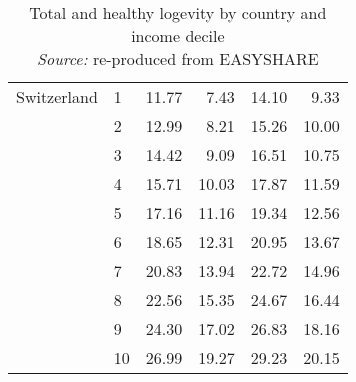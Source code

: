 \begin{table}
\begin{tabular}{llrrrr}
Switzerland & 1  &   11.77 &   7.43 &  14.10 &   9.33 \\
            & 2  &   12.99 &   8.21 &  15.26 &  10.00 \\
            & 3  &   14.42 &   9.09 &  16.51 &  10.75 \\
            & 4  &   15.71 &  10.03 &  17.87 &  11.59 \\
            & 5  &   17.16 &  11.16 &  19.34 &  12.56 \\
            & 6  &   18.65 &  12.31 &  20.95 &  13.67 \\
            & 7  &   20.83 &  13.94 &  22.72 &  14.96 \\
            & 8  &   22.56 &  15.35 &  24.67 &  16.44 \\
            & 9  &   24.30 &  17.02 &  26.83 &  18.16 \\
            & 10 &   26.99 &  19.27 &  29.23 &  20.15 \\


\bottomrule
\end{tabular}
\captionsetup{justification=centering}
\caption{Total and healthy logevity by country and income decile \\ 
\textit{Source:} re-produced from EASYSHARE }
\end{table}



